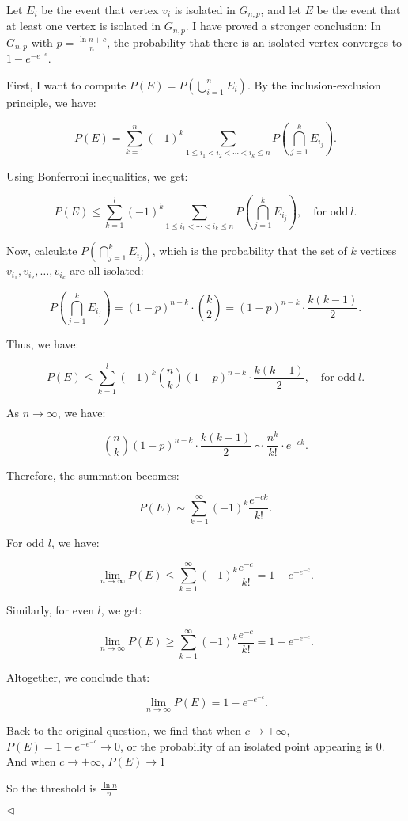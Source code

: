 \documentclass[11pt]{article}
\newenvironment{answer}[1][Answer]{\begin{trivlist}
\item[\hskip \labelsep {\bfseries #1.}\hskip \labelsep]}{\hfill$\lhd$\end{trivlist}}
\begin{document}
\begin{answer}
Let \( E_i \) be the event that vertex \( v_i \) is isolated in \( G_{n,p} \), and let \( E \) be the event that at least one vertex is isolated in \( G_{n,p} \). I have proved a stronger conclusion: In \( G_{n,p} \) with \( p = \frac{\ln n + c}{n} \), the probability that there is an isolated vertex converges to \( 1 - e^{-e^{-c}} \). 

First, I want to compute \( P(E) = P\left( \bigcup_{i=1}^{n} E_i \right) \). By the inclusion-exclusion principle, we have:

\[
P(E) = \sum_{k=1}^{n} (-1)^k \sum_{1 \leq i_1 < i_2 < \cdots < i_k \leq n} P\left( \bigcap_{j=1}^{k} E_{i_j} \right).
\]

Using Bonferroni inequalities, we get:

\[
P(E) \leq \sum_{k=1}^{l} (-1)^k \sum_{1 \leq i_1 < \cdots < i_k \leq n} P\left( \bigcap_{j=1}^{k} E_{i_j} \right), \quad \text{for odd} \ l.
\]

Now, calculate \( P\left( \bigcap_{j=1}^{k} E_{i_j} \right) \), which is the probability that the set of \( k \) vertices \( v_{i_1}, v_{i_2}, \dots, v_{i_k} \) are all isolated:

\[
P\left( \bigcap_{j=1}^{k} E_{i_j} \right) = (1 - p)^{n-k} \cdot \binom{k}{2} = (1 - p)^{n-k} \cdot \frac{k(k-1)}{2}.
\]

Thus, we have:

\[
P(E) \leq \sum_{k=1}^{l} (-1)^k \binom{n}{k} (1 - p)^{n-k} \cdot \frac{k(k-1)}{2}, \quad \text{for odd} \ l.
\]

As \( n \to \infty \), we have:

\[
\binom{n}{k} (1 - p)^{n-k} \cdot \frac{k(k-1)}{2} \sim \frac{n^k}{k!} \cdot e^{-ck}.
\]

Therefore, the summation becomes:

\[
P(E) \sim \sum_{k=1}^{\infty} (-1)^k \frac{e^{-ck}}{k!}.
\]

For odd \( l \), we have:

\[
\lim_{n \to \infty} P(E) \leq \sum_{k=1}^{\infty} (-1)^k \frac{e^{-c}}{k!} = 1 - e^{-e^{-c}}.
\]

Similarly, for even \( l \), we get:

\[
\lim_{n \to \infty} P(E) \geq \sum_{k=1}^{\infty} (-1)^k \frac{e^{-c}}{k!} = 1 - e^{-e^{-c}}.
\]

Altogether, we conclude that:

\[
\lim_{n \to \infty} P(E) = 1 - e^{-e^{-c}}.
\]

Back to the original question, we find that when $c\to +\infty$, $P(E)=1-e^{-e^{-c}}\to 0$, or the probability of an isolated point appearing is 0. And when $c\to +\infty$, $P(E)\to 1$

So the threshold is $\frac{\ln n}{n}$

\end{answer}
\end{document}
